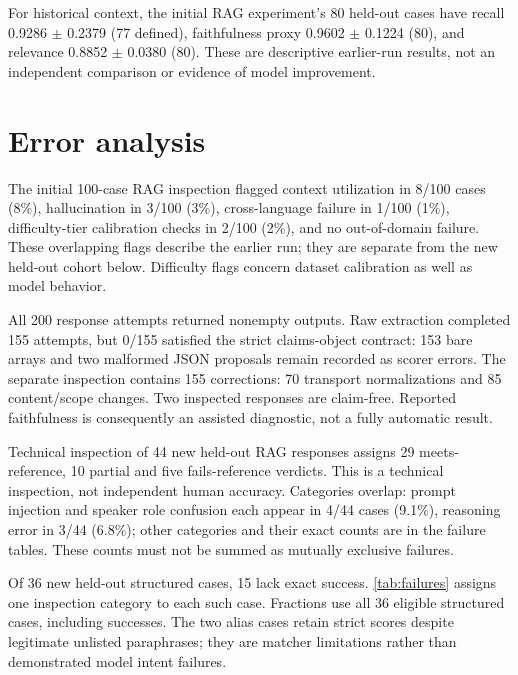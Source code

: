 \documentclass{amsart}
\theoremstyle{definition}
\numberwithin{equation}{section}
\begin{document}
For historical context, the initial RAG experiment's 80 held-out cases have recall 0.9286 \(\pm\) 0.2379 (77 defined), faithfulness proxy 0.9602 \(\pm\) 0.1224 (80), and relevance 0.8852 \(\pm\) 0.0380 (80). These are descriptive earlier-run results, not an independent comparison or evidence of model improvement.

\section{Error analysis}\label{sec:error-analysis}
The initial 100-case RAG inspection flagged context utilization in 8/100 cases (8\%), hallucination in 3/100 (3\%), cross-language failure in 1/100 (1\%), difficulty-tier calibration checks in 2/100 (2\%), and no out-of-domain failure. These overlapping flags describe the earlier run; they are separate from the new held-out cohort below. Difficulty flags concern dataset calibration as well as model behavior.

All 200 response attempts returned nonempty outputs. Raw extraction completed 155 attempts, but 0/155 satisfied the strict claims-object contract: 153 bare arrays and two malformed JSON proposals remain recorded as scorer errors. The separate inspection contains 155 corrections: 70 transport normalizations and 85 content/scope changes. Two inspected responses are claim-free. Reported faithfulness is consequently an assisted diagnostic, not a fully automatic result.

Technical inspection of 44 new held-out RAG responses assigns 29 meets-reference, 10 partial and five fails-reference verdicts. This is a technical inspection, not independent human accuracy. Categories overlap: prompt injection and speaker role confusion each appear in 4/44 cases (9.1\%), reasoning error in 3/44 (6.8\%); other categories and their exact counts are in the failure tables. These counts must not be summed as mutually exclusive failures.

Of 36 new held-out structured cases, 15 lack exact success. \autoref{tab:failures} assigns one inspection category to each such case. Fractions use all 36 eligible structured cases, including successes. The two alias cases retain strict scores despite legitimate unlisted paraphrases; they are matcher limitations rather than demonstrated model intent failures.
\end{document}
